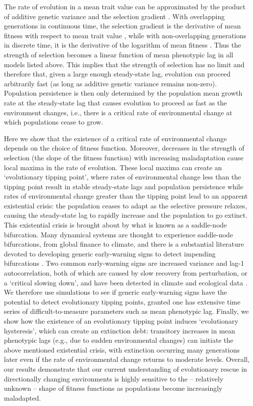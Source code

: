 \documentclass[12pt,letterpaper]{article} %
\begin{document}
The rate of evolution in a mean trait value can be approximated by the product of additive genetic variance and the selection gradient \citep[][]{Lande1976}.
With overlapping generations in continuous time, the selection gradient is the derivative of mean fitness with respect to mean trait value \citep[][equation 11]{Lande1982b}, while with non-overlapping generations in discrete time, it is the derivative of the logarithm of mean fitness \citep[][equation 7]{Lande1976}. 
Thus the strength of selection becomes a linear function of mean phenotypic lag in all models listed above.  
This implies that the strength of selection has no limit and therefore that, given a large enough steady-state lag, evolution can proceed arbitrarily fast (as long as additive genetic variance remains non-zero).
Population persistence is then only determined by the population mean growth rate at the steady-state lag that causes evolution to proceed as fast as the environment changes, i.e., there is a critical rate of environmental change at which populations cease to grow.

Here we show that the existence of a critical rate of environmental change depends on the choice of fitness function. 
Moreover, decreases in the strength of selection (the slope of the fitness function) with increasing maladaptation cause local maxima in the rate of evolution.
These local maxima can create an `evolutionary tipping point', where rates of environmental change less than the tipping point result in stable steady-state lags and population persistence while rates of environmental change greater than the tipping point lead to an apparent existential crisis: the population ceases to adapt as the selective pressure relaxes, causing the steady-state lag to rapidly increase and the population to go extinct. 
This existential crisis is brought about by what is known as a saddle-node bifurcation.
Many dynamical systems are thought to experience saddle-node bifurcations, from global finance to climate, and there is a substantial literature devoted to developing generic early-warning signs to detect impending bifurcations \citep[reviewed in][]{Scheffer2009}.
Two common early-warning signs are increased variance and lag-1 autocorrelation, both of which are caused by slow recovery from perturbation, or a `critical slowing down', and have been detected in climate and ecological data \citep{Scheffer2009,Lenton2011}.
We therefore use simulations to see if generic early-warning signs have the potential to detect evolutionary tipping points, granted one has extensive time series of difficult-to-measure parameters such as mean phenotypic lag.
Finally, we show how the existence of an evolutionary tipping point induces `evolutionary hysteresis', which can create an extinction debt: transitory increases in mean phenotypic lags (e.g., due to sudden environmental changes) can initiate the above mentioned existential crisis, with extinction occurring many generations later even if the rate of environmental change returns to moderate levels.
Overall, our results demonstrate that our current understanding of evolutionary rescue in directionally changing environments is highly sensitive to the -- relatively unknown -- shape of fitness functions as populations become increasingly maladapted.
\end{document}
